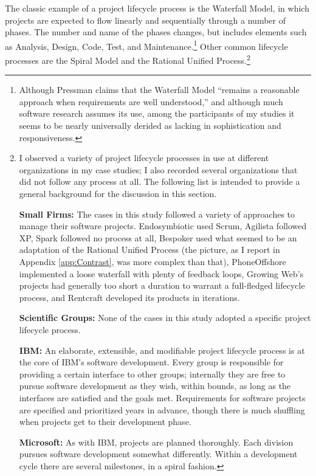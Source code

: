 The classic example of a project lifecycle process is the Waterfall Model, in which projects are expected to flow linearly and sequentially through a number of phases. The number and name of the phases changes, but includes elements such as Analysis, Design, Code, Test, and Maintenance.\footnote{Although Pressman  claims that the Waterfall Model ``remains a reasonable approach when requirements are well understood,'' and although much software research assumes its use, among the participants of my studies it seems to be nearly universally derided as lacking in sophistication and responsiveness.} Other common lifecycle processes are the Spiral Model and the Rational Unified Process.\footnote{I observed a variety of project lifecycle processes in use at different organizations in my case studies; I also recorded several organizations that did not follow any process at all. The following list is intended to provide a general background for the discussion in this section.
\par \textbf{Small Firms:} The cases in this study followed a variety of approaches to manage their software projects. Endosymbiotic used Scrum, Agilista followed XP, Spark followed no process at all, Bespoker used what seemed to be an adaptation of the Rational Unified Process (the picture, as I report in Appendix \ref{app:Contrast}, was more complex than that), PhoneOffshore implemented a loose waterfall with plenty of feedback loops, Growing Web's projects had generally too short a duration to warrant a full-fledged lifecycle process, and Rentcraft developed its products in iterations.
\par \textbf{Scientific Groups:} None of the cases in this study adopted a specific project lifecycle process.
\par \textbf{IBM:} An elaborate, extensible, and modifiable project lifecycle process is at the core of IBM's software development. Every group is responsible for providing a certain interface to other groups; internally they are free to pursue software development as they wish, within bounds, as long as the interfaces are satisfied and the goals met. Requirements for software projects are specified and prioritized years in advance, though there is much shuffling when projects get to their development phase.
\par \textbf{Microsoft:} As with IBM, projects are planned thoroughly. Each division pursues software development somewhat differently. Within a development cycle there are several milestones, in a spiral fashion.
}
